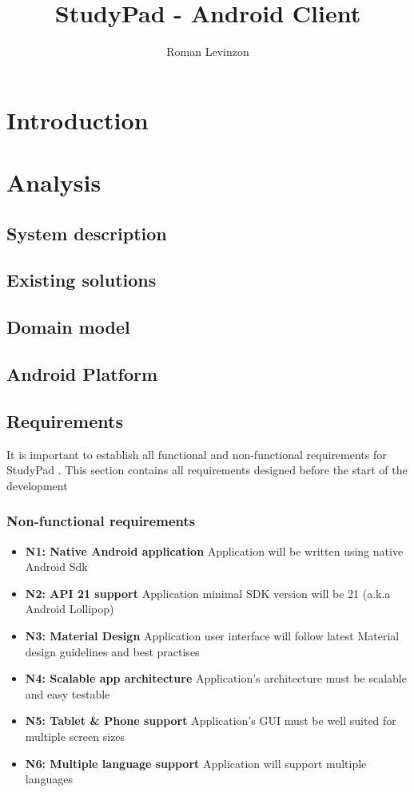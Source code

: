 \documentclass[thesis=B,english]{FITthesis}[2012/10/20]
\title{StudyPad - Android Client}
\author{Roman Levinzon} %
\newcommand{\appname}{StudyPad \space}
\begin{document}

\chapter{Introduction}



\chapter{Analysis}
\section{System description}
\section{Existing solutions}
\section{Domain model}
\section{Android Platform}

\newpage
\section{Requirements}
It is important to establish all functional and non-functional requirements for \appname. This section contains all requirements designed before the start
of the development

\subsection{Non-functional requirements}

\begin{itemize}
  \item \textbf{N1: Native Android application}  Application will be written using native Android Sdk
  \item \textbf{N2: API 21 support} Application minimal SDK version will be 21 (a.k.a Android Lollipop)
  \item \textbf{N3: Material Design} Application user interface will follow latest Material design guidelines and best practises
  \item \textbf{N4: Scalable app architecture} Application's architecture must be scalable and easy testable
  \item \textbf{N5: Tablet \& Phone support} Application's GUI must be well suited for multiple screen sizes
  \item \textbf{N6: Multiple language support} Application will support multiple languages
\end{itemize}
\end{document}
